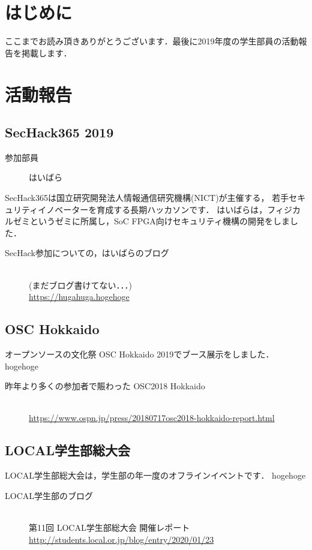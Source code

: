 \section{はじめに}
ここまでお読み頂きありがとうございます．最後に2019年度の学生部員の活動報告を掲載します．

\section{活動報告}
\subsection{SecHack365 2019}
\begin{description}
\item[参加部員] はいばら
\end{description}
SecHack365は国立研究開発法人情報通信研究機構(NICT)が主催する，
若手セキュリティイノベーターを育成する長期ハッカソンです．
はいばらは，フィジカルゼミというゼミに所属し，SoC FPGA向けセキュリティ機構の開発をしました．
\mbox{}\\
\begin{description}
\item[SecHack参加についての，はいばらのブログ]\mbox{}\\
(まだブログ書けてない．．．)\mbox{}\\
\url{https://hugahuga.hogehoge}
\end{description}

\subsection{OSC Hokkaido}
オープンソースの文化祭 OSC Hokkaido 2019でブース展示をしました．
hogehoge
\mbox{}\\
\begin{description}
\item[昨年より多くの参加者で賑わった OSC2018 Hokkaido]\mbox{}\\
\url{https://www.ospn.jp/press/20180717osc2018-hokkaido-report.html}
\end{description}

\subsection{LOCAL学生部総大会}
LOCAL学生部総大会は，学生部の年一度のオフラインイベントです．
hogehoge
\mbox{}\\
\begin{description}
\item[LOCAL学生部のブログ]\mbox{}\\
第11回 LOCAL学生部総大会 開催レポート\mbox{}\\
\url{http://students.local.or.jp/blog/entry/2020/01/23}
\end{description}

